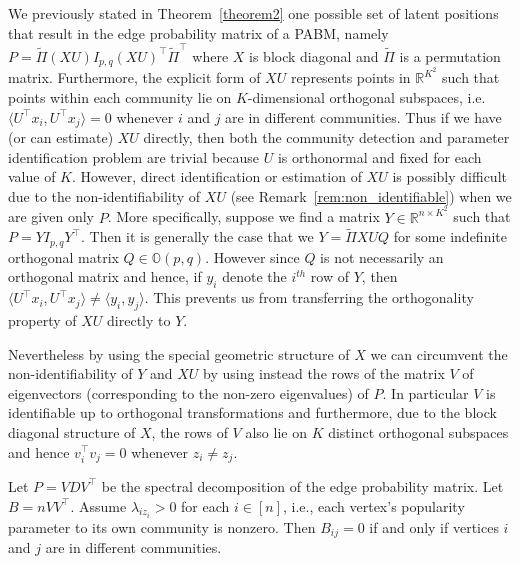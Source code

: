\documentclass[12pt]{article}
\begin{document}
We previously stated in Theorem~\ref{theorem2} one possible set of latent positions that result in
the edge probability matrix of a PABM, namely
\(P = \tilde{\Pi} (XU) I_{p, q}
(XU)^\top \tilde{\Pi}^{\top}\) where $X$ is block diagonal and
$\tilde{\Pi}$ is a permutation matrix.  
Furthermore, the explicit form of \(XU\) represents points in \(\mathbb{R}^{K^2}\)
such that points within each community lie on \(K\)-dimensional
orthogonal subspaces, i.e. $\langle U^{\top} x_i, U^{\top} x_j \rangle = 0$ whenever $i$ and $j$ are in different communities. 
Thus if we have (or can estimate) \(XU\) directly, then both the community
detection and parameter identification problem are trivial because \(U\)
is orthonormal and fixed for each value of \(K\). 
However, direct
identification or estimation of \(XU\) is possibly difficult 
due to the non-identifiability of $XU$ (see Remark~\ref{rem:non_identifiable})
when we are given only $P$. 
More specifically, suppose we find a matrix $Y \in
\mathbb{R}^{n \times K^2}$
such that \(P = Y I_{p, q} Y^\top\). Then it is generally the case that
we  \( Y = \tilde{\Pi} XU Q \) for some indefinite orthogonal matrix
$Q \in \mathbb{O}(p,q)$. 
However since \(Q\) is not necessarily an
orthogonal matrix and hence, if $y_i$ denote the $i^{th}$ row of $Y$, 
then $\langle U^{\top} x_i, U^{\top} x_j \rangle
\neq \langle y_i, y_j \rangle$.
This prevents us from transferring the orthogonality property of
\(XU\) directly to $Y$. 

Nevertheless by using the special geometric structure of $X$ we can circumvent the
non-identifiability of $Y$ and $XU$ by using instead the rows of the
matrix $V$ of eigenvectors (corresponding to the non-zero eigenvalues) of $P$. In particular $V$ is identifiable
up to orthogonal transformations and furthermore, due to the block
diagonal structure of $X$, the rows of $V$ also lie on $K$ distinct orthogonal
subspaces and hence $v_i^{\top} v_j = 0$ whenever $z_i \not = z_j$. 

\begin{theorem}
\label{theorem3}
Let $P = V D V^\top$ be the spectral decomposition 
of the edge probability matrix. 
Let $B = n V V^\top$. 
Assume $\lambda_{i z_i} > 0$ for each $i \in [n]$, 
i.e., each vertex's popularity parameter to its own community is nonzero. 
Then $B_{ij} = 0$ if and only if 
vertices $i$ and $j$ are in different communities.
\end{theorem}
\end{document}
